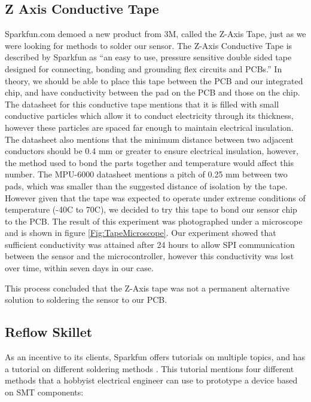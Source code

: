 \subsection{Z Axis Conductive Tape}
\label{Sec:ZTape}
Sparkfun.com demoed a new product from 3M,
called the Z-Axis Tape,
just as we were looking for methods to solder our sensor.
The Z-Axis Conductive Tape is described by Sparkfun as ``an easy to use,
pressure sensitive double sided tape designed for connecting,
bonding and grounding flex circuits and PCBs.''
In theory, we should be able to place this tape between the PCB and our integrated chip,
and have conductivity between the pad on the PCB and those on the chip.
The datasheet for this conductive tape mentions that it is filled with small conductive particles which allow it to conduct electricity through its thickness,
however these particles are spaced far enough to maintain electrical insulation.
The datasheet also mentions that the minimum distance between two adjacent conductors should be 0.4 mm or greater to ensure electrical insulation,
however, the method used to bond the parts together and temperature would affect this number.
The MPU-6000 datasheet mentions a pitch of 0.25 mm between two pads,
which was smaller than the suggested distance of isolation by the tape.
However given that the tape was expected to operate under extreme conditions of temperature (-40\degree C to 70\degree C),
we decided to try this tape to bond our sensor chip to the PCB.
The result of this experiment was photographed under a microscope and is shown in figure \ref{Fig:TapeMicroscope}.
Our experiment showed that sufficient conductivity was attained after 24 hours to allow SPI communication between the sensor and the microcontroller,
however this conductivity was lost over time,
within seven days in our case.

This process concluded that the Z-Axis tape was not a permanent alternative solution to soldering the sensor to our PCB.

\subsection{Reflow Skillet}
\label{Sec:ToasterReflow}
As an incentive to its clients,
Sparkfun offers tutorials on multiple topics,
and has a tutorial on different soldering methods \cite{Web:SparkfunSoldering}.
This tutorial mentions four different methods that a hobbyist electrical engineer can use to prototype a device based on SMT components:

